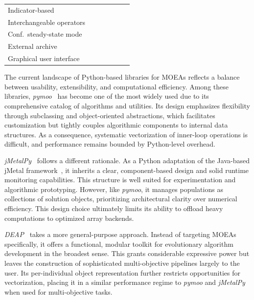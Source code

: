\documentclass[final,5p,times,twocolumn]{elsarticle}
\newcommand{\cmark}{\ding{51}}
\newcommand{\pmark}{\ding{109}}
\newcommand{\xmark}{\ding{55}}
\begin{document}
\begin{table}[!ht]
{\begin{tabular}{@{}lcccccc@{}}
Indicator-based               & \pmark & \cmark & \xmark & \cmark & \xmark & \cmark \\
Interchangeable operators     & \cmark & \cmark & \cmark & \pmark & \xmark & \cmark \\
Conf.\ steady-state mode      & \cmark & \cmark & \pmark & \xmark & \xmark & \cmark \\
External archive              & \xmark & \pmark & \pmark & \cmark & \xmark & \cmark \\
Graphical user interface      & \xmark & \xmark & \xmark & \xmark & \xmark & \cmark \\
\bottomrule
\end{tabular}}
\end{table}

The current landscape of Python-based libraries for MOEAs reflects a balance between usability, extensibility, and computational efficiency. Among these libraries, \textit{pymoo}~\cite{BD20} has become one of the most widely used due to its comprehensive catalog of algorithms and utilities. Its design emphasizes flexibility through subclassing and object-oriented abstractions, which facilitates customization but tightly couples algorithmic components to internal data structures. As a consequence, systematic vectorization of inner-loop operations is difficult, and performance remains bounded by Python-level overhead.

\textit{jMetalPy}~\cite{BNG+19} follows a different rationale. As a Python adaptation of the Java-based jMetal framework~\cite{DN11}, it inherits a clear, component-based design and solid runtime monitoring capabilities. This structure is well suited for experimentation and algorithmic prototyping. However, like \textit{pymoo}, it manages populations as collections of solution objects, prioritizing architectural clarity over numerical efficiency. This design choice ultimately limits its ability to offload heavy computations to optimized array backends.

\textit{DEAP}~\cite{FDG+12}  takes a more general-purpose approach. Instead of targeting MOEAs specifically, it offers a functional, modular toolkit for evolutionary algorithm development in the broadest sense. This grants considerable expressive power but leaves the construction of sophisticated multi-objective pipelines largely to the user. Its per-individual object representation further restricts opportunities for vectorization, placing it in a similar performance regime to \textit{pymoo} and \textit{jMetalPy} when used for multi-objective tasks.
\end{document}
